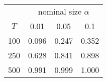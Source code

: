 % 
\begin{tabular}{cccc}
  \hline
  & \multicolumn{3}{c}{nominal size $\alpha$} \\
 $T$ & 0.01 & 0.05 & 0.1 \\
 \hline
100 & 0.096 & 0.247 & 0.352 \\ 
  250 & 0.628 & 0.841 & 0.898 \\ 
  500 & 0.991 & 0.999 & 1.000 \\ 
   \hline
\end{tabular}
